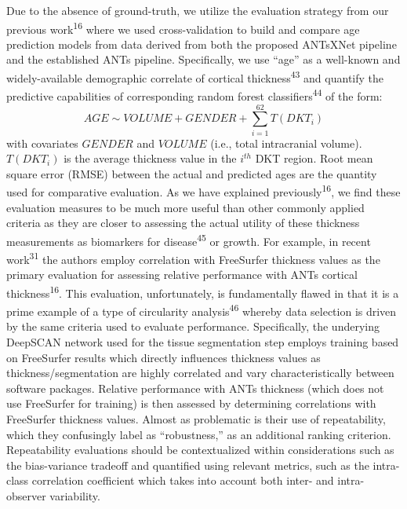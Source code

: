 \documentclass[12pt,]{article}
\begin{document}
Due to the absence of ground-truth, we utilize the evaluation strategy
from our previous work\textsuperscript{16} where we used
cross-validation to build and compare age prediction models from data
derived from both the proposed ANTsXNet pipeline and the established
ANTs pipeline. Specifically, we use ``age'' as a well-known and
widely-available demographic correlate of cortical
thickness\textsuperscript{43} and quantify the predictive capabilities
of corresponding random forest classifiers\textsuperscript{44} of the
form: \begin{equation} AGE
\sim VOLUME + GENDER + \sum_{i=1}^{62} T(DKT_i) \end{equation} with
covariates \(GENDER\) and \(VOLUME\) (i.e., total intracranial volume).
\(T(DKT_i)\) is the average thickness value in the \(i^{th}\) DKT
region. Root mean square error (RMSE) between the actual and predicted
ages are the quantity used for comparative evaluation. As we have
explained previously\textsuperscript{16}, we find these evaluation
measures to be much more useful than other commonly applied criteria as
they are closer to assessing the actual utility of these thickness
measurements as biomarkers for disease\textsuperscript{45} or growth.
For example, in recent work\textsuperscript{31} the authors employ
correlation with FreeSurfer thickness values as the primary evaluation
for assessing relative performance with ANTs cortical
thickness\textsuperscript{16}. This evaluation, unfortunately, is
fundamentally flawed in that it is a prime example of a type of
circularity analysis\textsuperscript{46} whereby data selection is
driven by the same criteria used to evaluate performance. Specifically,
the underying DeepSCAN network used for the tissue segmentation step
employs training based on FreeSurfer results which directly influences
thickness values as thickness/segmentation are highly correlated and
vary characteristically between software packages. Relative performance
with ANTs thickness (which does not use FreeSurfer for training) is then
assessed by determining correlations with FreeSurfer thickness values.
Almost as problematic is their use of repeatability, which they
confusingly label as ``robustness,'' as an additional ranking criterion.
Repeatability evaluations should be contextualized within considerations
such as the bias-variance tradeoff and quantified using relevant
metrics, such as the intra-class correlation coefficient which takes
into account both inter- and intra-observer variability.
\end{document}
